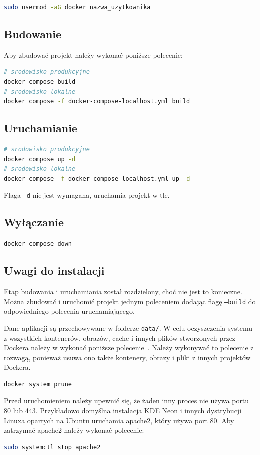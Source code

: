 \documentclass[shortabstract]{iithesis}
\begin{document}
\begin{lstlisting}[language=bash]
sudo usermod -aG docker nazwa_uzytkownika
\end{lstlisting}

\subsection{Budowanie}
\noindent
Aby zbudować projekt należy wykonać poniższe polecenie:

\begin{lstlisting}[language=bash]
# srodowisko produkcyjne
docker compose build
# srodowisko lokalne
docker compose -f docker-compose-localhost.yml build
\end{lstlisting}

\newpage
\subsection{Uruchamianie}
\begin{lstlisting}[language=bash]
# srodowisko produkcyjne
docker compose up -d
# srodowisko lokalne
docker compose -f docker-compose-localhost.yml up -d
\end{lstlisting}
Flaga \texttt{-d} nie jest wymagana, uruchamia projekt w tle.

\subsection{Wyłączanie}
\begin{lstlisting}[language=bash]
docker compose down
\end{lstlisting}

\subsection{Uwagi do instalacji}
Etap budowania i uruchamiania został rozdzielony, choć nie jest to konieczne.
Można zbudować i uruchomić projekt jednym poleceniem dodając flagę \texttt{--build} do odpowiedniego polecenia uruchamiającego.

Dane aplikacji są przechowywane w folderze \texttt{data/}.
W celu oczyszczenia systemu z wszystkich kontenerów, obrazów, cache i innych plików stworzonych przez Dockera należy w wykonać poniższe polecenie~\cite{DockerPrune}.
Należy wykonywać to polecenie z rozwagą, ponieważ usuwa ono także kontenery, obrazy i pliki z innych projektów Dockera.
\begin{lstlisting}[language=bash]
docker system prune
\end{lstlisting}
Przed uruchomieniem należy upewnić się, że żaden inny proces nie używa portu 80 lub 443.
Przykładowo domyślna instalacja KDE Neon i innych dystrybucji Linuxa opartych na Ubuntu uruchamia apache2, który używa port 80.
Aby zatrzymać apache2 należy wykonać polecenie:
\begin{lstlisting}[language=bash]
sudo systemctl stop apache2
\end{lstlisting}
\end{document}
